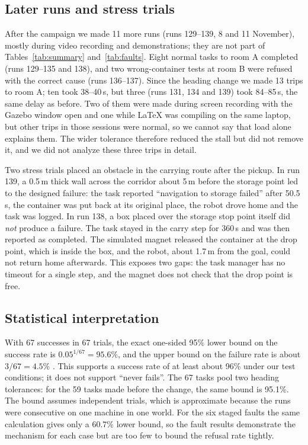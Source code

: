 \documentclass[conference]{IEEEtran}
\begin{document}
\subsection{Later runs and stress trials}\label{sec:later}
After the campaign we made 11 more runs (runs 129--139, 8 and 11 November), mostly during video recording and demonstrations; they are not part of Tables~\ref{tab:summary} and~\ref{tab:faults}. Eight normal tasks to room A completed (runs 129--135 and 138), and two wrong-container tests at room B were refused with the correct cause (runs 136--137). Since the heading change we made 13 trips to room A; ten took 38--40\,s, but three (runs 131, 134 and 139) took 84--85\,s, the same delay as before. Two of them were made during screen recording with the Gazebo window open and one while LaTeX was compiling on the same laptop, but other trips in those sessions were normal, so we cannot say that load alone explains them. The wider tolerance therefore reduced the stall but did not remove it, and we did not analyze these three trips in detail.

Two stress trials placed an obstacle in the carrying route after the pickup. In run 139, a 0.5\,m thick wall across the corridor about 5\,m before the storage point led to the designed failure: the task reported ``navigation to storage failed'' after 50.5\,s, the container was put back at its original place, the robot drove home and the task was logged. In run 138, a box placed over the storage stop point itself did \emph{not} produce a failure. The task stayed in the carry step for 360\,s and was then reported as completed. The simulated magnet released the container at the drop point, which is inside the box, and the robot, about 1.7\,m from the goal, could not return home afterwards. This exposes two gaps: the task manager has no timeout for a single step, and the magnet does not check that the drop point is free.

\subsection{Statistical interpretation}
With 67 successes in 67 trials, the exact one-sided 95\% lower bound on the success rate is $0.05^{1/67}=95.6\%$, and the upper bound on the failure rate is about $3/67=4.5\%$ \cite{hanley1983zero}. This supports a success rate of at least about 96\% under our test conditions; it does not support ``never fails''. The 67 tasks pool two heading tolerances: for the 59 tasks made before the change, the same bound is 95.1\%. The bound assumes independent trials, which is approximate because the runs were consecutive on one machine in one world. For the six staged faults the same calculation gives only a 60.7\% lower bound, so the fault results demonstrate the mechanism for each case but are too few to bound the refusal rate tightly.
\end{document}

